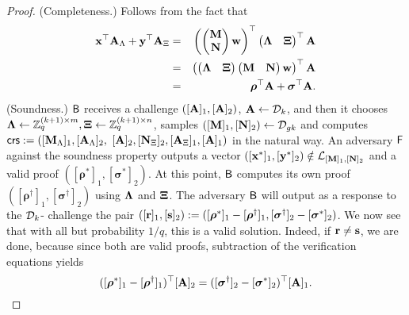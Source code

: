 \begin{proof}
(Completeness.) Follows from the fact that
\begin{eqnarray*}
\mathbf{x}^\top\mathbf{{A}}_\Lambda+\mathbf{y}^\top\mathbf{{A}}_\Xi
& = &
\left(
\begin{pmatrix}\mathbf{{M}}\\\mathbf{{N}}\end{pmatrix}\mathbf{w}
\right)^\top
\begin{pmatrix}\mathbf{{\Lambda}}& \mathbf{{\Xi}}\end{pmatrix}^\top
\mathbf{{A}}\\
& = &
\left(
\begin{pmatrix}\mathbf{{\Lambda}}&\mathbf{{\Xi}}\end{pmatrix}
\begin{pmatrix}\mathbf{{M}}&\mathbf{{N}}\end{pmatrix}\mathbf{w}
\right)^\top
\mathbf{{A}}\\
& = &
{\boldsymbol \rho}^\top\mathbf{{A}}+{\boldsymbol \sigma}^\top\mathbf{{A}}.
\end{eqnarray*}
(Soundness.) $\mathsf{B}$ receives a challenge $([\mathbf{{A}}]_1,[\mathbf{{A}}]_2)$, $\mathbf{{A}} \gets \mathcal{D}_k$, and then it chooses $\mathbf{{\Lambda}}\gets\mathbb{Z}_q^{(k+1)\times m},\mathbf{{\Xi}}\gets\mathbb{Z}_q^{(k+1)\times n}$, samples $([\mathbf{{M}}]_1,[\mathbf{{N}}]_2) \gets \mathcal{D}_{gk}$ and computes 
   $\mathsf{crs}:=([\mathbf{{M}}_{\Lambda}]_1, [\mathbf{{A}}_\Lambda]_2 ,$ $[\mathbf{{A}}]_2, [\mathbf{{N}}_{\Xi}]_2,[\mathbf{{A}}_{\Xi}]_1,[\mathbf{{A}}]_1)$ in the natural way.
An adversary $\mathsf{F}$ against the soundness property outputs a vector $([{\mathbf{x}}^*]_1,[\mathbf{y}^*]_2) \notin \mathcal{L}_{[\mathbf{{M}}]_1,[\mathbf{{N}}]_2}$ and a valid proof
$([{\boldsymbol \rho}^{*}]_1, [{\boldsymbol \sigma}^{*}]_2)$. At this point, $\mathsf{B}$ computes its own proof $([{\boldsymbol \rho}^{\dagger}]_1, [{\boldsymbol \sigma}^{\dagger}]_2)$ using $\mathbf{{\Lambda}}$ and $\mathbf{{\Xi}}$. The adversary $\mathsf{B}$ will output as a response to the $\mathcal{D}_k$-\skermdh{} challenge the pair $([\mathbf{r}]_1,[\mathbf{s}]_2):=([{\boldsymbol \rho}^{*}]_1-[{\boldsymbol \rho}^{\dagger}]_1,[{  \boldsymbol \sigma}^{\dagger}]_2-[{\boldsymbol \sigma}^{*}]_2)$. We now see that with all but probability $1/q$, this is a valid 
solution. Indeed, if $\mathbf{r} \neq \mathbf{s}$, we are done, because since both are valid proofs, subtraction of the verification equations yields
\begin{equation*}
([{\boldsymbol \rho}^{*}]_1-[{\boldsymbol \rho}^{\dagger}]_1)^{\top} [\mathbf{{A}}]_2=  ([{\boldsymbol \sigma}^{\dagger}]_2-[{\boldsymbol \sigma}^{*}]_2)^{\top} [\mathbf{{A}}]_1.
\end{equation*}

\end{proof}
